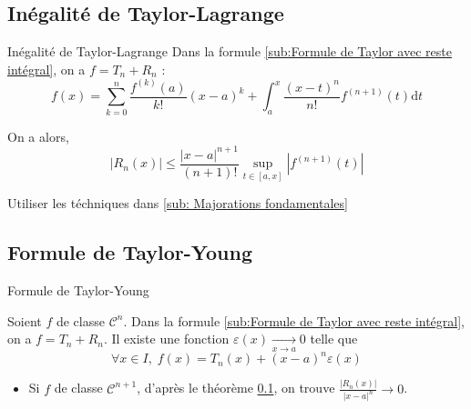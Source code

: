 \subsection{Inégalité de Taylor-Lagrange} %
\label{sub:Inégalité de Taylor-Lagrange}

\begin{Theorem}{\color{red} Inégalité de Taylor-Lagrange}{}
  Dans la formule \ref{sub:Formule de Taylor avec reste intégral}, on a $f = T_n + R_n$ : 
  \begin{equation}
  f(x) = \sum_{k=0}^{n} \frac{f ^{(k)}(a)}{k!} (x-a) ^{k} + \int_{a}^{x} \frac{(x-t) ^{n}
  }{n!}  f ^{(n+1)}(t) \mathrm{d}t
  \end{equation}


On a alors, 
  \begin{equation}
    |R_n(x) | \le \frac{|x-a| ^{n+1}}{(n+1)!} \sup _{t \in [a,x]} |f ^{(n+1)}(t)|
  \end{equation}

\end{Theorem}

\begin{myproof}{}{}
  Utiliser les téchniques dans \ref{sub: Majorations fondamentales}
\end{myproof}


\subsection{Formule de Taylor-Young} %
\label{sub:Formule de Taylor-Young}

\begin{Theorem}{\color{red} Formule de Taylor-Young}{}

  Soient $f$ de classe $\mathscr{C} ^{n}$. Dans la formule \ref{sub:Formule de Taylor avec reste intégral}, on a $f = T_n + R_n$. Il existe une fonction $\varepsilon (x)  \underset{x \to a}{\longrightarrow} 0$ telle que 
  \begin{equation}
    \forall x \in I, \; f(x) = T_n(x) + (x-a) ^{n}\varepsilon(x)
  \end{equation}
\end{Theorem}

\begin{myproof}{}{}
\begin{itemize}

  \item Si $f$ de classe $\mathscr{C} ^{n+1}$, d'après le théorème \ref{sub:Inégalité de Taylor-Lagrange}, on trouve $\frac{|R_n(x)|}{|x-a| ^{n}} \to 0$.

\end{itemize}
\end{myproof}

